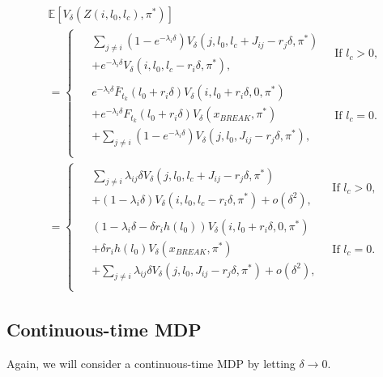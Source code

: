 \begin{equation}\label{eq:MmfmNextState}
\begin{split}
&\mathbb{E}[V_\delta(Z(i,l_0,l_c),\pi^*)]\\
&=\begin{cases}
\begin{split}
&\sum\limits_{j\neq i}(1-e^{-\lambda_i \delta})V_\delta(j,l_0,l_c+J_{ij}-r_j\delta,\pi^*)\\
&+e^{-\lambda_i \delta}V_\delta(i,l_0,l_c-r_i\delta,\pi^*),
\end{split}&\ \text{If $l_c>0$,}\\
\begin{split}
&e^{-\lambda_i \delta} \bar{F}_{t_k}(l_0+r_i\delta)V_\delta(i,l_0+r_i\delta,0,\pi^*)\\
&+ e^{-\lambda_i \delta}F_{t_k}(l_0+r_i\delta)V_\delta(x_{BREAK},\pi^*)\\
&+\sum\limits_{j\neq i}(1-e^{-\lambda_i \delta})V_\delta(j,l_0,J_{ij}-r_j\delta,\pi^*),
\end{split}&\ \text{If $l_c=0$.}\\
\end{cases}\\
&=\begin{cases}
\begin{split}
&\sum\limits_{j\neq i}\lambda_{ij}\delta V_\delta(j,l_0,l_c+J_{ij}-r_j\delta,\pi^*)\\
&+(1-\lambda_i \delta)V_\delta(i,l_0,l_c-r_i\delta,\pi^*)+o(\delta^2),
\end{split}
&\ \text{If $l_c>0$,}\\
\begin{split}
&(1-\lambda_i \delta-\delta r_ih(l_0))V_\delta(i,l_0+r_i\delta,0,\pi^*)\\
&+ \delta r_ih(l_0)V_\delta(x_{BREAK},\pi^*)\\
&+\sum\limits_{j\neq i}\lambda_{ij} \delta V_\delta(j,l_0,J_{ij}-r_j\delta,\pi^*)+o(\delta^2),
\end{split}&\ \text{If $l_c=0$.}\\
\end{cases}
\end{split}
\end{equation}

\subsection{Continuous-time MDP}
Again, we will consider a continuous-time MDP by letting $\delta\rightarrow0$.

